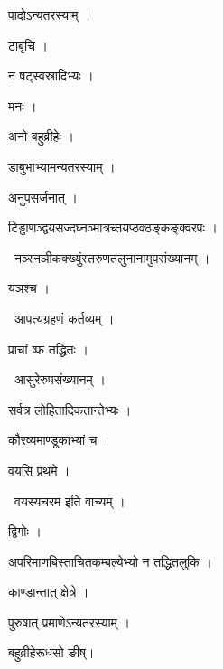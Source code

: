 \documentclass[10pt, openany, oneside]{book}
\begin{document}
\noindent पादोऽन्यतरस्याम् ।

\noindent टाबृचि ।

\noindent न षट्स्वस्रादिभ्यः ।

\noindent मनः ।

\noindent अनो बहुव्रीहेः ।

\noindent डाबुभाभ्यामन्यतरस्याम् ।

\noindent अनुपसर्जनात् ।

\noindent टिड्ढाणञ्द्वयसज्दघ्नञ्मात्रच्तयप्ठक्ठङ्कङ्क्वरपः ।

\par\noindent\hspace{1.5em}{\vps वा॰}~{\qt नञ्स्नञीकक्ख्युंस्तरुणतलुनानामुपसंख्यानम् ।}

\noindent यञश्च ।

\par\noindent\hspace{1.5em}{\vps वा॰}~{\qt आपत्यग्रहणं कर्तव्यम् ।}

\noindent प्राचां ष्फ तद्धितः ।

\par\noindent\hspace{1.5em}{\vps वा॰}~{\qt आसुरेरुपसंख्यानम् ।}

\noindent सर्वत्र लोहितादिकतान्तेभ्यः ।

\noindent कौरव्यमाण्डूकाभ्यां च ।

\noindent वयसि प्रथमे ।

\par\noindent\hspace{1.5em}{\vps वा॰}~{\qt वयस्यचरम इति वाच्यम् ।}

\noindent द्विगोः ।

\noindent अपरिमाणबिस्ताचितकम्बल्येभ्यो न तद्धितलुकि ।

\noindent काण्डान्तात् क्षेत्रे ।

\noindent पुरुषात् प्रमाणेऽन्यतरस्याम् ।

\noindent बहुव्रीहेरूधसो ङीष्।
\end{document}
